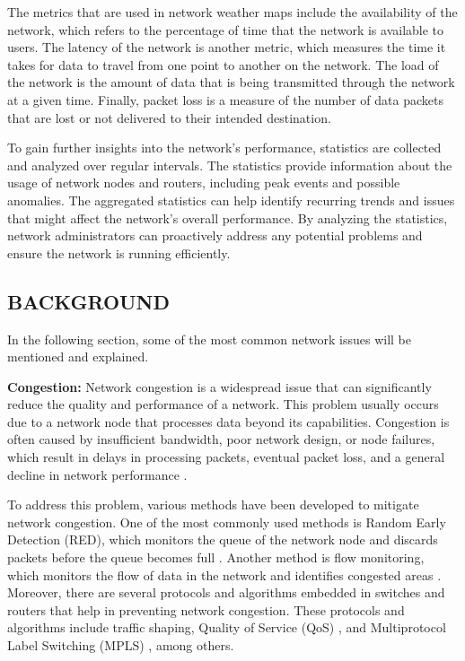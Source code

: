 \documentclass[sigconf,authorversion,nonacm]{acmart}
\begin{document}
The metrics that are used in network weather maps include the availability of the network, which refers to the percentage of time that the network is available to users. The latency of the network is another metric, which measures the time it takes for data to travel from one point to another on the network. The load of the network is the amount of data that is being transmitted through the network at a given time. Finally, packet loss is a measure of the number of data packets that are lost or not delivered to their intended destination.

To gain further insights into the network's performance, statistics are collected and analyzed over regular intervals. The statistics provide information about the usage of network nodes and routers, including peak events and possible anomalies. The aggregated statistics can help identify recurring trends and issues that might affect the network's overall performance. By analyzing the statistics, network administrators can proactively address any potential problems and ensure the network is running efficiently. 

\subsection{BACKGROUND}
In the following section, some of the most common network issues will be mentioned and explained. 


\textbf{Congestion:} Network congestion is a widespread issue that can significantly reduce the quality and performance of a network. This problem usually occurs due to a network node that processes data beyond its capabilities. Congestion is often caused by insufficient bandwidth, poor network design, or node failures, which result in delays in processing packets, eventual packet loss, and a general decline in network performance \cite{simulation}.

To address this problem, various methods have been developed to mitigate network congestion. One of the most commonly used methods is Random Early Detection (RED), which monitors the queue of the network node and discards packets before the queue becomes full \cite{10.1145/263105.263154 }. Another method is flow monitoring, which monitors the flow of data in the network and identifies congested areas \cite{10.1145/3342280.3342305 }. Moreover, there are several protocols and algorithms embedded in switches and routers that help in preventing network congestion. These protocols and algorithms include traffic shaping, Quality of Service (QoS) \cite{VanMieghem2003}, and Multiprotocol Label Switching (MPLS) \cite{Conte2003}, among others.
\end{document}
